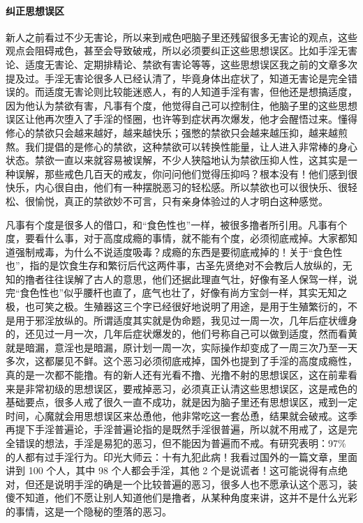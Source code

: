 \paragraph{纠正思想误区}

新人之前看过不少无害论，所以来到戒色吧脑子里还残留很多无害论的观点，这些观点会阻碍戒色，甚至会导致破戒，所以必须要纠正这些思想误区。比如手淫无害论、适度无害论、定期排精论、禁欲有害论等等，这些思想误区我之前的文章多次提及过。手淫无害论很多人已经认清了，毕竟身体出症状了，知道无害论是完全错误的。而适度无害论则比较能迷惑人，有的人知道手淫有害，但他还是想搞适度，因为他认为禁欲有害，凡事有个度，他觉得自己可以控制住，他脑子里的这些思想误区让他再次堕入了手淫的怪圈，也许等到症状再次爆发，他才会醒悟过来。懂得修心的禁欲只会越来越好，越来越快乐；强憋的禁欲只会越来越压抑，越来越煎熬。我们提倡的是修心的禁欲，这种禁欲可以转换性能量，让人进入非常棒的身心状态。禁欲一直以来就容易被误解，不少人狭隘地认为禁欲压抑人性，这其实是一种误解，那些戒色几百天的戒友，你问问他们觉得压抑吗？根本没有！他们感到很快乐，内心很自由，他们有一种摆脱恶习的轻松感。所以禁欲也可以很快乐、很轻松、很愉悦，真正的禁欲妙不可言，只有亲身体验过的人才明白这种感觉。

凡事有个度是很多人的借口，和“食色性也”一样，被很多撸者所引用。凡事有个度，要看什么事，对于高度成瘾的事情，就不能有个度，必须彻底戒掉。大家都知道强制戒毒，为什么不说适度吸毒？成瘾的东西是要彻底戒掉的！关于“食色性也”，指的是饮食生存和繁衍后代这两件事，古圣先贤绝对不会教后人放纵的，无知的撸者往往误解了古人的意思，他们还据此理直气壮，好像有圣人保驾一样，说完“食色性也”似乎腰杆也直了，底气也壮了，好像有尚方宝剑一样，其实无知之极，也可笑之极。生殖器这三个字已经很好地说明了用途，是用于生殖繁衍的，不是用于邪淫放纵的。所谓适度其实就是伪命题，我见过一周一次，几年后症状缠身的，还见过一月一次，几年后症状爆发的，他们号称自己可以做到适度，然而看黄就是暗漏，意淫也是暗漏，原计划一周一次，实际操作却变成了一周三次乃至一天多次，这都屡见不鲜。这个恶习必须彻底戒掉，国外也提到了手淫的高度成瘾性，真的是一次都不能撸。有的新人还有光看不撸、光撸不射的思想误区，这在前辈看来是非常初级的思想误区，要戒掉恶习，必须真正认清这些思想误区，这是戒色的基础要点，很多人戒了很久一直不成功，就是因为脑子里还有思想误区，戒到一定时间，心魔就会用思想误区来怂恿他，他非常吃这一套怂恿，结果就会破戒。这季再提下手淫普遍论，手淫普遍论指的是既然手淫很普遍，所以就不用戒了，这是完全错误的想法，手淫是易犯的恶习，但不能因为普遍而不戒。有研究表明：97\% 的人都有过手淫行为。印光大师云：十有九犯此病！我看过国外的一篇文章，里面讲到 100 个人，其中 98 个人都会手淫，其他 2 个是说谎者！这可能说得有点绝对，但还是说明手淫的确是一个比较普遍的恶习，很多人也不愿承认这个恶习，装傻不知道，他们不愿让别人知道他们是撸者，从某种角度来讲，这并不是什么光彩的事情，这是一个隐秘的堕落的恶习。

